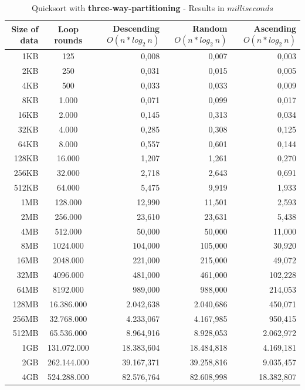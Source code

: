 \documentclass[11pt]{amsart}
\begin{document}
\clearpage
\begin{table}[htdp]
	\caption{Quicksort with \textbf{three-way-partitioning} - Results in $milliseconds$}
	\begin{tabular}{|r|c|r|r|r|} \hline
		Size of data & Loop rounds & \parbox[c]{3.5cm}{Descending \\ $O(n*log_2~n)$} & \parbox[c]{3.5cm}{Random \\$O(n*log_2~n)$} & \parbox[c]{3.5cm}{Ascending \\ $O(n*log_2~n)$} \\ \hline
		1KB & 125 & 0,008 & 0,007 & 0,003 \\ \hline
		2KB & 250 & 0,031 & 0,015 & 0,005 \\ \hline
		4KB & 500 & 0,033 & 0,033 & 0,009 \\ \hline
		8KB & 1.000 & 0,071 & 0,099 & 0,017 \\ \hline
		16KB & 2.000 & 0,145 & 0,313 & 0,034 \\ \hline
		32KB & 4.000 & 0,285 & 0,308 & 0,125 \\ \hline
		64KB & 8.000 & 0,557 & 0,601 & 0,144 \\ \hline
		128KB & 16.000 & 1,207 & 1,261 & 0,270 \\ \hline
		256KB & 32.000& 2,718 & 2,643 & 0,691 \\ \hline
		512KB & 64.000 & 5,475 & 9,919 & 1,933 \\ \hline
		1MB & 128.000 & 12,990 & 11,501 & 2,593 \\ \hline
		2MB & 256.000 & 23,610 & 23,631 & 5,438 \\ \hline
		4MB & 512.000 & 50,000 & 50,000 & 11,000 \\ \hline
		8MB & 1024.000 & 104,000 & 105,000 & 30,920 \\ \hline
		16MB & 2048.000 & 221,000 & 215,000 & 49,072 \\ \hline
		32MB & 4096.000 & 481,000 & 461,000 & 102,228 \\ \hline
		64MB & 8192.000 & 989,000 & 988,000 & 214,053 \\ \hline
		128MB & 16.386.000 & 2.042,638 & 2.040,686 & 450,071 \\ \hline
		256MB & 32.768.000 & 4.233,067 & 4.167,985 & 950,415 \\ \hline
		512MB & 65.536.000 & 8.964,916 & 8.928,053 & 2.062,972 \\ \hline
		1GB & 131.072.000 & 18.383,604 & 18.484,818 & 4.169,181 \\ \hline
		2GB & 262.144.000 & 39.167,371 & 39.258,816 & 9.035,457 \\ \hline
		4GB & 524.288.000 & 82.576,764 & 82.608,998 & 18.382,807 \\ \hline
	\end{tabular}
	\label{default}
\end{table}%
\end{document}
